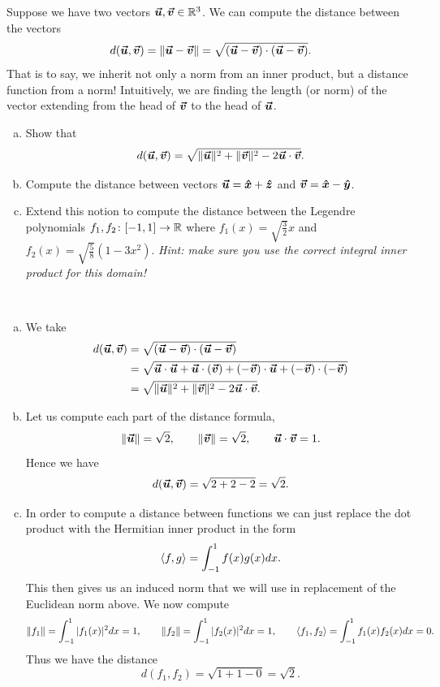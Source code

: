 \documentclass[12pt]{article} %
\begin{document}
\newpage
\begin{problem}
	Suppose we have two vectors $\boldsymbol{\vec{u}},\boldsymbol{\vec{v}} \in \mathbb{R}^3$.  We can compute the distance between the vectors
	\[
	d(\boldsymbol{\vec{u}},\boldsymbol{\vec{v}}) = \|\boldsymbol{\vec{u}}-\boldsymbol{\vec{v}}\| = \sqrt{(\boldsymbol{\vec{u}}-\boldsymbol{\vec{v}})\cdot(\boldsymbol{\vec{u}}-\boldsymbol{\vec{v}})}.
	\]
	That is to say, we inherit not only a norm from an inner product, but a distance function from a norm!  Intuitively, we are finding the length (or norm) of the vector extending from the head of $\boldsymbol{\vec{v}}$ to the head of $\boldsymbol{\vec{u}}$.
	\begin{enumerate}[(a)]
		\item Show that
		\[
		d(\boldsymbol{\vec{u}},\boldsymbol{\vec{v}}) = \sqrt{\|\boldsymbol{\vec{u}}\|^2+\|\boldsymbol{\vec{v}}\|^2-2\boldsymbol{\vec{u}}\cdot \boldsymbol{\vec{v}}}.
		\]
		\item Compute the distance between vectors $\boldsymbol{\vec{u}}=\boldsymbol{\hat{x}} + \boldsymbol{\hat{z}}$ and $\boldsymbol{\vec{v}} = \boldsymbol{\hat{x}} - \boldsymbol{\hat{y}}$.  
		\item Extend this notion to compute the distance between the Legendre polynomials $f_1,f_2\colon [-1,1] \to \mathbb{R}$ where $f_1(x)=\sqrt{\frac{3}{2}}x$ and $f_2(x)=\sqrt{\frac{5}{8}}\left(1-3x^2\right)$. \emph{Hint: make sure you use the correct integral inner product for this domain!}
	\end{enumerate}
\end{problem}
\begin{solution}~
	\begin{enumerate}[(a)]
		\item We take
		\begin{align*}
			d(\boldsymbol{\vec{u}},\boldsymbol{\vec{v}})&= \sqrt{(\boldsymbol{\vec{u}}-\boldsymbol{\vec{v}})\cdot(\boldsymbol{\vec{u}}-\boldsymbol{\vec{v}})}\\
				&= \sqrt{\boldsymbol{\vec{u}}\cdot \boldsymbol{\vec{u}} + \boldsymbol{\vec{u}}\cdot (\boldsymbol{\vec{v}}) + (-\boldsymbol{\vec{v}})\cdot \boldsymbol{\vec{u}} +(-\boldsymbol{\vec{v}})\cdot (-\boldsymbol{\vec{v}})}\\
				&= \sqrt{\|\boldsymbol{\vec{u}}\|^2 + \|\boldsymbol{\vec{v}}\|^2 -2\boldsymbol{\vec{u}} \cdot \boldsymbol{\vec{v}}}.
		\end{align*}
		\item Let us compute each part of the distance formula,
		\[
		\|\boldsymbol{\vec{u}}\|= \sqrt{2}, \qquad \|\boldsymbol{\vec{v}}\|=\sqrt{2}, \qquad \boldsymbol{\vec{u}} \cdot \boldsymbol{\vec{v}} = 1.
		\]
		Hence we have
		\[
		d(\boldsymbol{\vec{u}},\boldsymbol{\vec{v}}) = \sqrt{2+2-2}=\sqrt{2}.
		\]
		\item In order to compute a distance between functions we can just replace the dot product with the Hermitian inner product in the form 
		\[
		\left\langle f, g \right\rangle=\int_{-1}^1 f(x)g(x)dx. 
		\]
		This then gives us an induced norm that we will use in replacement of the Euclidean norm above.  We now compute
		\[
		\|f_1\| = \int_{-1}^1 |f_1(x)|^2 dx = 1, \qquad \|f_2\|=\int_{-1}^1 |f_2(x)|^2dx =1, \qquad \left\langle f_1, f_2 \right\rangle = \int_{-1}^1 f_1(x)f_2(x)dx =0.
		\]
		Thus we have the distance
		\[
		d(f_1,f_2) = \sqrt{1+1-0}=\sqrt{2}.
		\]
	\end{enumerate}
\end{solution}
\end{document}
